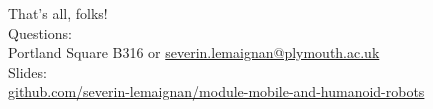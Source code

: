 \documentclass[compress]{beamer}
\begin{document}

\begin{frame}{}
    \begin{center}
        \Large
        That's all, folks!\\[2em]
        \normalsize
        Questions:\\
        Portland Square B316 or \url{severin.lemaignan@plymouth.ac.uk} \\[1em]

        Slides:\\ \href{https://github.com/severin-lemaignan/module-mobile-and-humanoid-robots}{\small github.com/severin-lemaignan/module-mobile-and-humanoid-robots}

    \end{center}
\end{frame}
\end{document}
